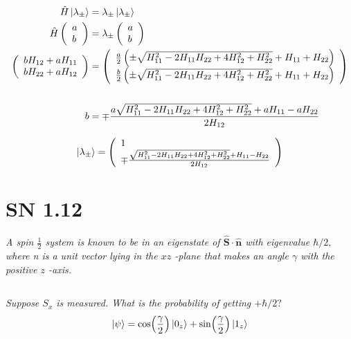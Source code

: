 \documentclass{article}
\begin{document}
\begin{align*}
    \hat{H} \ket{\lambda_\pm} &= \lambda_\pm \ket{\lambda_\pm}\\
    \hat{H} \left(\begin{array}{l}
        a \\
        b
        \end{array}\right) &= \lambda_\pm \left(\begin{array}{l}
        a \\
        b
        \end{array}\right)\\
        \left(\begin{array}{l}
b H_{12}+a H_{11} \\
b H_{22}+a H_{12}
\end{array}\right)&=\left(\begin{array}{c}
\frac{a}{2}\left(\pm \sqrt{H_{11}^{2}-2 H_{11} H_{22}+4 H_{12}^{2}+H_{22}^{2}}+H_{11}+H_{22}\right) \\
\frac{b}{2} \left(\pm \sqrt{H_{11}^{2}-2 H_{11} H_{22}+4 H_{12}^{2}+H_{22}^{2}}+H_{11}+H_{22}\right)
\end{array}\right)\\
&\\
b &= \mp \frac{a \sqrt{H_{11}^2-2 H_{11} H_{22}+4 H_{12}^2+H_{22}^2}+a H_{11}-a H_{22}}{2 H_{12}}
\end{align*}

$$\ket{\lambda_\pm} =  \left(\begin{array}{l}
        1 \\
        \mp \frac{ \sqrt{H_{11}^2-2 H_{11} H_{22}+4 H_{12}^2+H_{22}^2}+ H_{11}- H_{22}}{2 H_{12}}
        \end{array}\right)
$$

\newpage

\section{SN 1.12}
\textit{A spin $\frac{1}{2}$ system is known to be in an eigenstate of $\hat{\mathbf{S}} \cdot \hat{\mathbf{n}}$ with eigenvalue $\hbar / 2,$ where n is a unit vector lying in the $x z$ -plane that makes an angle $\gamma$ with the positive $z$ -axis.}
\subsection{}
\textit{Suppose $S_{x}$ is measured. What is the probability of getting $+\hbar / 2 ?$}
$$\ket{\psi} = \cos (\frac{\gamma }{2}) \ket{0_z} + \sin (\frac{\gamma }{2}) \ket{1_z}$$
\end{document}
